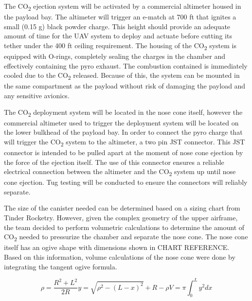         The CO\textsubscript{2} ejection system will be activated by a commercial altimeter housed in the payload bay. The altimeter will trigger an e-match at 700 ft that ignites a small (0.15 g) black powder charge. This height should provide an adequate amount of time for the UAV system to deploy and actuate before cutting its tether under the 400 ft ceiling requirement. The housing of the CO\textsubscript{2} system is equipped with O-rings, completely sealing the charges in the chamber and effectively containing the pyro exhaust. The combustion contained is immediately cooled due to the CO\textsubscript{2} released. Because of this, the system can be mounted in the same compartment as the payload without risk of damaging the payload and any sensitive avionics. 
        
        The CO\textsubscript{2} deployment system will be located in the nose cone itself, however the commercial altimeter used to trigger the deployment system will be located on the lower bulkhead of the payload bay. In order to connect the pyro charge that will trigger the CO\textsubscript{2} system to the altimeter, a two pin JST connector. This JST connector is intended to be pulled apart at the moment of nose cone ejection by the force of the ejection itself. The use of this connector ensures a reliable electrical connection between the altimeter and the CO\textsubscript{2} system up until nose cone ejection. Tug testing will be conducted to ensure the connectors will reliably separate. 

        The size of the canister needed can be determined based on a sizing chart from Tinder Rocketry. However, given the complex geometry of the upper airframe, the team decided to perform volumetric calculations to determine the amount of CO\textsubscript{2} needed to pressurize the chamber and separate the nose cone. The nose cone itself has an ogive shape with dimensions shown in CHART REFERENCE.  Based on this information, volume calculations of the nose cone were done by integrating the tangent ogive formula.

        \begin{subequations}\label{parachute}
            \begin{equation}
                \rho = \frac{R^2 + L^2}{2 R}
            \end{equation}
            \begin{equation}
                y = \sqrt{\rho^2 - (L - x)^2} + R - \rho
            \end{equation}
            \begin{equation}
                V = \pi \int_{0}^{L} y^2 dx
            \end{equation}
        \end{subequations}
